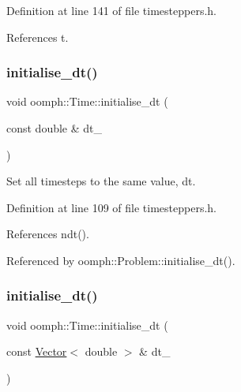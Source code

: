 Definition at line 141 of file timesteppers.\+h.



References t.

\mbox{\label{classoomph_1_1Time_abc1e02cc2988b603bd5e1f6747381546}} 
\subsubsection{\texorpdfstring{initialise\+\_\+dt()}{initialise\_dt()}\hspace{0.1cm}{\footnotesize\ttfamily [1/2]}}
{\footnotesize\ttfamily void oomph\+::\+Time\+::initialise\+\_\+dt (\begin{DoxyParamCaption}\item[{const double \&}]{dt\+\_\+ }\end{DoxyParamCaption})\hspace{0.3cm}{\ttfamily [inline]}}



Set all timesteps to the same value, dt. 



Definition at line 109 of file timesteppers.\+h.



References ndt().



Referenced by oomph\+::\+Problem\+::initialise\+\_\+dt().

\mbox{\label{classoomph_1_1Time_a7c0e382ecec0abb600c36bc5a0820a43}} 
\subsubsection{\texorpdfstring{initialise\+\_\+dt()}{initialise\_dt()}\hspace{0.1cm}{\footnotesize\ttfamily [2/2]}}
{\footnotesize\ttfamily void oomph\+::\+Time\+::initialise\+\_\+dt (\begin{DoxyParamCaption}\item[{const \hyperlink{classoomph_1_1Vector}{Vector}$<$ double $>$ \&}]{dt\+\_\+ }\end{DoxyParamCaption})\hspace{0.3cm}{\ttfamily [inline]}}



